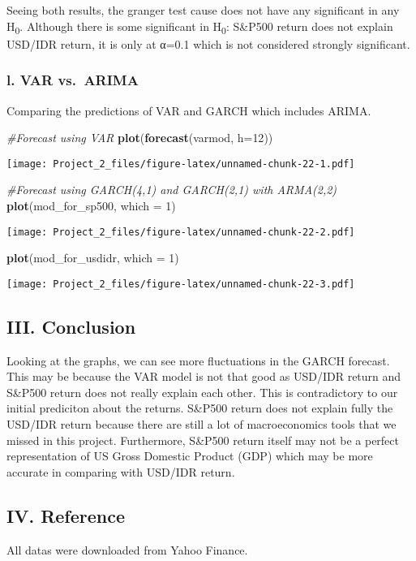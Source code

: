 \documentclass[]{article}
\newenvironment{Shaded}{\begin{snugshade}}{\end{snugshade}}
\newcommand{\KeywordTok}[1]{\textcolor[rgb]{0.13,0.29,0.53}{\textbf{#1}}}
\newcommand{\DataTypeTok}[1]{\textcolor[rgb]{0.13,0.29,0.53}{#1}}
\newcommand{\DecValTok}[1]{\textcolor[rgb]{0.00,0.00,0.81}{#1}}
\newcommand{\CommentTok}[1]{\textcolor[rgb]{0.56,0.35,0.01}{\textit{#1}}}
\newcommand{\NormalTok}[1]{#1}
\begin{document}
Seeing both results, the granger test cause does not have any
significant in any H\textsubscript{0}. Although there is some
significant in H\textsubscript{0}: S\&P500 return does not explain
USD/IDR return, it is only at α=0.1 which is not considered strongly
significant.

\subsubsection{l. VAR vs.~ARIMA}\label{l.-var-vs.arima}

Comparing the predictions of VAR and GARCH which includes ARIMA.

\begin{Shaded}
\begin{Highlighting}[]
\CommentTok{#Forecast using VAR}
\KeywordTok{plot}\NormalTok{(}\KeywordTok{forecast}\NormalTok{(varmod, }\DataTypeTok{h=}\DecValTok{12}\NormalTok{))}
\end{Highlighting}
\end{Shaded}

\texttt{[image: Project\_2\_files/figure-latex/unnamed-chunk-22-1.pdf]}

\begin{Shaded}
\begin{Highlighting}[]
\CommentTok{#Forecast using GARCH(4,1) and GARCH(2,1) with ARMA(2,2)}
\KeywordTok{plot}\NormalTok{(mod_for_sp500, }\DataTypeTok{which =} \DecValTok{1}\NormalTok{)}
\end{Highlighting}
\end{Shaded}

\texttt{[image: Project\_2\_files/figure-latex/unnamed-chunk-22-2.pdf]}

\begin{Shaded}
\begin{Highlighting}[]
\KeywordTok{plot}\NormalTok{(mod_for_usdidr, }\DataTypeTok{which =} \DecValTok{1}\NormalTok{)}
\end{Highlighting}
\end{Shaded}

\texttt{[image: Project\_2\_files/figure-latex/unnamed-chunk-22-3.pdf]}

\subsection{III. Conclusion}\label{iii.-conclusion}

Looking at the graphs, we can see more fluctuations in the GARCH
forecast. This may be because the VAR model is not that good as USD/IDR
return and S\&P500 return does not really explain each other. This is
contradictory to our initial prediciton about the returns. S\&P500
return does not explain fully the USD/IDR return because there are still
a lot of macroeconomics tools that we missed in this project.
Furthermore, S\&P500 return itself may not be a perfect representation
of US Gross Domestic Product (GDP) which may be more accurate in
comparing with USD/IDR return.

\subsection{IV. Reference}\label{iv.-reference}

All datas were downloaded from Yahoo Finance.
\end{document}
